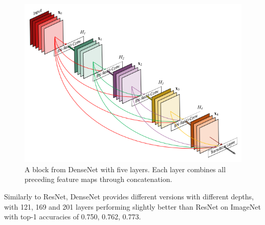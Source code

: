 \begin{figure}[ht]
  \centering
    \includegraphics[width=0.5\linewidth]{figs/densenet.png}
  \caption{A block from DenseNet with five layers. Each layer combines all preceding feature maps through concatenation. \cite{densenet}}
  \label{fig:densenet}
\end{figure}

Similarly to ResNet, DenseNet provides different versions with different depths, with 121, 169 and 201 layers performing slightly better than ResNet on ImageNet with top-1 accuracies of 0.750, 0.762, 0.773.

